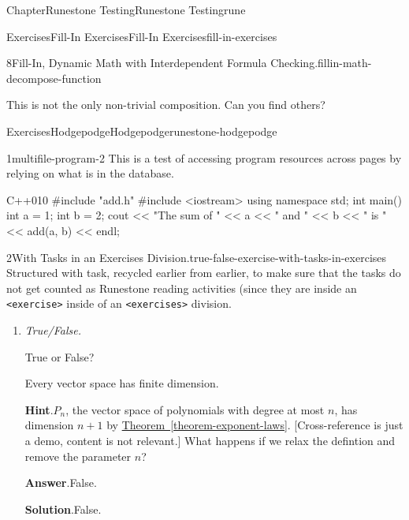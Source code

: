 \documentclass[oneside,10pt,]{book}
\newcommand{\blocktitlefont}{\relax}
\newcommand{\xreffont}{\relax}
\newcommand{\mono}[1]{\texttt{#1}}
\newcommand{\lititle}[1]{{\slshape#1}}
\numberwithin{equation}{section}
\begin{document}
\begin{chapterptx}{Chapter}{Runestone Testing}{}{Runestone Testing}{}{}{rune}
\begin{exercises-section}{Exercises}{Fill-In Exercises}{}{Fill-In Exercises}{}{}{fill-in-exercises}
\begin{divisionexercise}{8}{Fill-In, Dynamic Math with Interdependent Formula Checking.}{}{fillin-math-decompose-function}
\par
This is not the only non-trivial composition. Can you find others?%
\end{divisionexercise}%
\end{exercises-section}
%
%
\typeout{************************************************}
\typeout{************************************************}
%
\begin{exercises-section}{Exercises}{Hodgepodge}{}{Hodgepodge}{}{}{runestone-hodgepodge}
\begin{divisionexercise}{1}{}{}{multifile-program-2}%
This is a test of accessing program resources across pages by relying on what is in the database.%
\begin{program}{C++}{0}{1}{0}
#include "add.h"
#include <iostream>
using namespace std;
int main() {
    int a = 1;
    int b = 2;
    cout << "The sum of " << a << " and " << b << " is " << add(a, b) << endl;
}
\end{program}
\end{divisionexercise}%
\begin{divisionexercise}{2}{With Tasks in an Exercises Division.}{}{true-false-exercise-with-tasks-in-exercises}%
Structured with task, recycled earlier from earlier, to make sure that the tasks do not get counted as Runestone reading activities (since they are inside an \mono{<exercise>} inside of an \mono{<exercises>} division.%
\begin{enumerate}[font=\bfseries,label=(\alph*),ref=\alph*]%
\item{}\lititle{True\slash{}False.}\par%
True or False?%
\par
Every vector space has finite dimension.%
\par\smallskip%
\noindent\textbf{\blocktitlefont Hint}.\hypertarget{true-false-task-in-exercises-4}{}\quad{}\(P_n\), the vector space of polynomials with degree at most \(n\), has dimension \(n+1\) by \hyperref[theorem-exponent-laws]{Theorem~{\xreffont\ref{theorem-exponent-laws}}}.  [Cross-reference is just a demo, content is not relevant.]  What happens if we relax the defintion and remove the parameter \(n\)?%
\par\smallskip%
\noindent\textbf{\blocktitlefont Answer}.\hypertarget{true-false-task-in-exercises-5}{}\quad{}False.%
\par\smallskip%
\noindent\textbf{\blocktitlefont Solution}.\hypertarget{true-false-task-in-exercises-6}{}\quad{}False.%
\par

\end{enumerate}
\end{divisionexercise}
\end{exercises-section}
\end{chapterptx}
\end{document}
